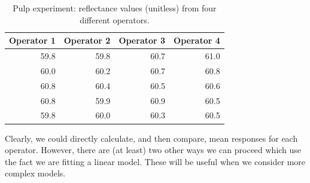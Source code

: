 \documentclass[
]{book}
\theoremstyle{definition}
\theoremstyle{definition}
\theoremstyle{definition}
\theoremstyle{definition}
\theoremstyle{remark}
\begin{document}
\begin{table}

\caption{\label{tab:one-way-analysis}Pulp experiment: reflectance values (unitless) from four different operators.}
\centering
\begin{tabular}[t]{r|r|r|r}
\hline
Operator 1 & Operator 2 & Operator 3 & Operator 4\\
\hline
59.8 & 59.8 & 60.7 & 61.0\\
\hline
60.0 & 60.2 & 60.7 & 60.8\\
\hline
60.8 & 60.4 & 60.5 & 60.6\\
\hline
60.8 & 59.9 & 60.9 & 60.5\\
\hline
59.8 & 60.0 & 60.3 & 60.5\\
\hline
\end{tabular}
\end{table}

Clearly, we could directly calculate, and then compare, mean responses for each operator. However, there are (at least) two other ways we can proceed which use the fact we are fitting a linear model. These will be useful when we consider more complex models.
\end{document}
